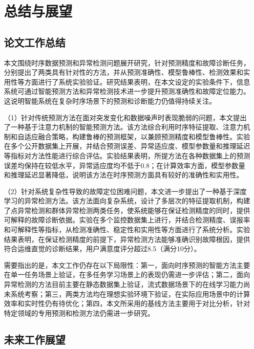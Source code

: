 
\chapter{总结与展望}\label{ch:conclusion}

\section{论文工作总结}\label{ux603bux7ed3}

本文围绕时序数据预测和异常检测问题展开研究，针对预测精度和故障诊断任务，分别提出了两类具有针对性的方法，并从预测准确性、模型鲁棒性、检测效果和实用性等方面进行了系统实验验证。研究结果表明，在本文设定的实验条件下，信息系统可通过智能预测方法和异常检测技术进一步提升预测准确性和故障定位能力。这说明智能系统在复杂时序场景下的预测和诊断能力仍值得持续关注。

（1）针对传统预测方法在面对突发变化和数据噪声时表现脆弱的问题，本文提出了一种基于注意力机制的智能预测方法。该方法综合利用时序特征提取、注意力机制和自适应融合策略，构建鲁棒的预测框架，以兼顾预测精度和模型鲁棒性。实验在多个公开数据集上开展，并结合预测误差、异常适应度、模型参数量和推理延迟等指标对方法性能进行综合评估。实验结果表明，所提方法在各种数据集上的预测误差均保持在较低水平，异常适应度均不低于0.8；在计算效率方面，模型参数量和推理延迟显著降低，说明该方法在时序预测方面具有较好的准确性和实用性。

（2）针对系统复杂性导致的故障定位困难问题，本文进一步提出了一种基于深度学习的异常检测方法。该方法面向复杂系统，设计了多层次的特征提取机制，构建了点异常检测和群体异常检测两类任务，使系统能够在保证检测精度的同时，提供可解释的故障诊断依据。实验在多个监控数据集上进行，并结合检测精度、误报率和可解释性等指标，从检测准确性、稳定性和实用性等方面进行了系统分析。实验结果表明，在保证检测精度的前提下，异常检测方法能够准确识别故障根因，提供符合运维直觉的诊断结果，用户满意度评分超过8.5（满分10分）。

需要指出的是，本文工作仍存在以下局限性：第一，面向时序预测的智能方法主要在单一任务场景上验证，在多任务学习场景上的表现仍需进一步评估；第二，面向异常检测的方法目前主要在静态数据集上验证，流式数据场景下的在线学习能力尚未系统考察；第三，两类方法均在理想实验环境下验证，在实际应用场景中的计算效率和实时性仍有待优化；第四，本文所采用的基线方法主要用于对比分析，针对特定领域的专用预测和检测方法仍需进一步研究。

\section{未来工作展望}\label{ux5c55ux671b}

